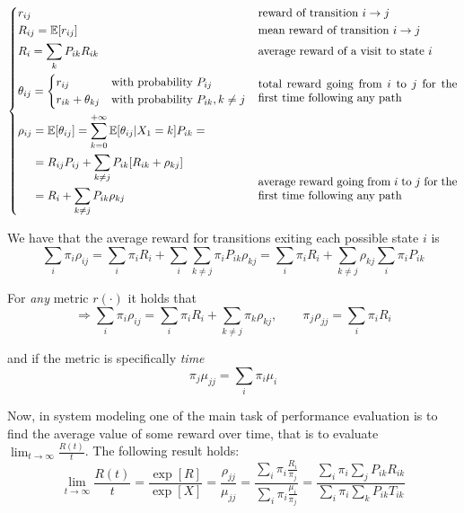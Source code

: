 \begin{equation*}
	\begin{dcases}
		r_{ij} & \text{reward of transition } i\rightarrow j \\
		R_{ij} = \exp[r_{ij}] & \text{mean reward of transition } i\rightarrow j\\
		R_i = \sum_k P_{ik} R_{ik} & \text{average reward of a visit to state } i\\
		\theta_{ij} =
			\begin{dcases}
				r_{ij} &\text{with probability } P_{ij}\\
				r_{ik}+\theta_{kj} &\text{with probability } P_{ik}, k\neq j
			\end{dcases}
			& \parbox[c]{.5\textwidth}{total reward going from $i$ to $j$ for the first time following any path} \\
			\begin{aligned}[b]
				\rho_{ij} &= \exp[\theta_{ij}] = \sum_{k=0}^{+\infty}\exp[\theta_{ij}| X_1=k] P_{ik} =\\
				&= R_{ij}P_{ij} +\sum_{k \neq j} P_{ik} [R_{ik}+\rho_{kj}] \\
				&= R_i + \sum_{k \neq j}P_{ik}\rho_{kj}
			\end{aligned} & \parbox[b]{.5\textwidth}{average reward going from $i$ to $j$ for the first time following any path}
	\end{dcases}
\end{equation*}

We have that the average reward for transitions exiting each possible state $i$ is
\begin{equation*}
\sum_i \pi_i \rho_{ij} = \sum_i \pi_i R_i + \sum_i \sum_{k \neq j} \pi_i P_{ik} \rho_{kj} = \sum_i \pi_i R_i + \sum_{k \neq j}\rho_{kj}\sum_i\pi_i P_{ik}
\end{equation*}

For \emph{any} metric $r(\cdot)$ it holds that
\begin{equation}
\Rightarrow\sum_i \pi_i \rho_{ij} = \sum_i \pi_i R_i + \sum_{k \neq j}\pi_k\rho_{kj},\qquad \pi_j\rho_{jj} = \sum_i \pi_i R_i
\end{equation}

and if the metric is specifically \emph{time}
\begin{equation}
\pi_j \mu_{jj} = \sum_i \pi_i \mu_i
\end{equation}

Now, in system modeling one of the main task of performance evaluation is to find the average value of some reward over time, that is to evaluate $\lim_{t \to \infty}\frac{R(t)}{t}$. The following result holds:
\begin{equation}
\lim_{t \to \infty}\frac{R(t)}{t} = \frac{\exp[R]}{\exp[X]} = \frac{\rho_{jj}}{\mu_{jj}} = \frac{\sum_i \pi_i \frac{R_i}{\pi_j}}{\sum_i \pi_i \frac{\mu_i}{\pi_j}} = \frac{\sum_i \pi_i \sum_j P_{ik} R_{ik}}{\sum_i \pi_i \sum_k P_{ik}T_{ik}}
\end{equation}

